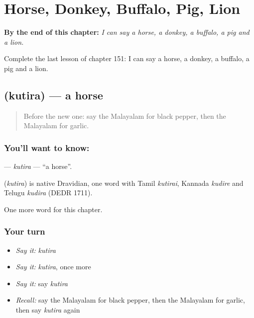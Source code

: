 
\chapter{Horse, Donkey, Buffalo, Pig, Lion}
\label{ch:ml-horse-donkey-buffalo-pig-lion}

\begin{chapteropening}
\textbf{By the end of this chapter:} \emph{I can say a horse, a donkey, a buffalo, a pig and a lion.}

Complete the last lesson of chapter 151: I can say a horse, a donkey, a buffalo, a pig and a lion.
\end{chapteropening}

\section[\texorpdfstring{\ml{കുതിര} (kutira)}{കുതിര (kutira)}]{ (kutira) — a horse}

\label{lesson:ML-C151-kutira}



\begin{quote}
Before the new one: say the Malayalam for black pepper, then the Malayalam for garlic.
\end{quote}

\subsection*{You'll want to know: }
\textbf{} — \emph{kutira} — \textquotedblleft{}a horse\textquotedblright{}.

\begin{cousinweb}
\textbf{} (\emph{kutira}) is native Dravidian, one word with Tamil \emph{kutirai}, Kannada \emph{kudire} and Telugu \emph{kudira} (DEDR 1711).
\end{cousinweb}

\begin{grammarlens}[title={What you've built}]
One more word for this chapter.
\end{grammarlens}

\subsection*{Your turn}
\begin{itemize}
\raggedright
  \item \emph{Say it:} \emph{kutira}
  \item \emph{Say it:} \emph{kutira}, once more
  \item \emph{Say it:} say \emph{kutira}
  \item \emph{Recall:} say the Malayalam for black pepper, then the Malayalam for garlic, then say \emph{kutira} again
\end{itemize}

